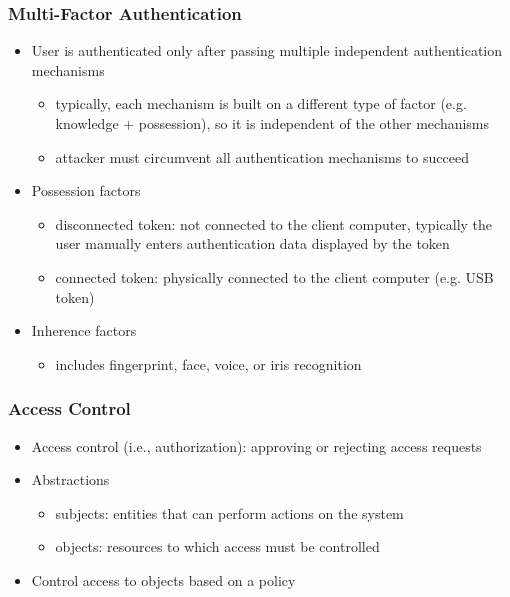 \documentclass[final]{article}
\begin{document}
\subsubsection*{Multi-Factor Authentication}
\begin{itemize}[nosep]
    \item User is authenticated only after passing multiple independent authentication mechanisms
          \begin{itemize}[nosep]
              \item typically, each mechanism is built on a different type of factor (e.g. knowledge + possession), so it is independent of the other mechanisms
              \item attacker must circumvent all authentication mechanisms to succeed
          \end{itemize}
    \item Possession factors
          \begin{itemize}[nosep]
              \item disconnected token: not connected to the client computer, typically the user manually enters authentication data displayed by the token
              \item connected token: physically connected to the client computer (e.g. USB token)
          \end{itemize}
    \item Inherence factors
          \begin{itemize}
              \item includes fingerprint, face, voice, or iris recognition
          \end{itemize}
\end{itemize}
\subsubsection*{Access Control}
\begin{itemize}[nosep]
    \item Access control (i.e., authorization): approving or rejecting access requests
    \item Abstractions
          \begin{itemize}[nosep]
              \item subjects: entities that can perform actions on the system
              \item objects: resources to which access must be controlled
          \end{itemize}
    \item Control access to objects based on a policy
\end{itemize}
\end{document}
